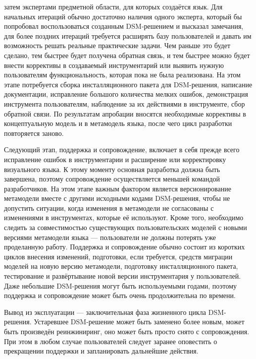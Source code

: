 \begin{enumerate}
		затем экспертами предметной области, для которых создаётся язык. Для начальных 
		итераций обычно достаточно наличия одного эксперта, который бы попробовал воспользоваться 
		созданным DSM-решением и высказал замечания, для более поздних итераций требуется 
		расширять базу пользователей и давать им возможность решать реальные практические задачи. 
		Чем раньше это будет сделано, тем быстрее будет получена обратная связь, и тем 
		быстрее можно будет внести коррективы в создаваемый инструментарий или выявить 
		нужную пользователям функциональность, которая пока не была реализована. На этом 
		этапе потребуется сборка инсталляционного пакета для DSM-решения, написание документации, 
		исправление большого количества мелких ошибок, демонстрация инструмента пользователям, 
		наблюдение за их действиями в инструменте, сбор обратной связи. По результатам 
		апробации вносятся необходимые коррективы в концептуальную модель и в метамодель 
		языка, после чего цикл разработки повторяется заново.
\end{enumerate}

Следующий этап, поддержка и сопровождение, включает в себя прежде всего исправление 
ошибок в инструментарии и расширение или корректировку визуального языка. К этому 
моменту основная разработка должна быть завершена, поэтому сопровождение осуществляется 
меньшей командой разработчиков. На этом этапе важным фактором является версионирование 
метамодели вместе с другими исходными кодами DSM-решения, чтобы не допустить ситуации, 
когда изменения в метамодели не согласованы с изменениями в инструментах, которые её 
используют. Кроме того, необходимо следить за совместимостью существующих пользовательских 
моделей с новыми версиями метамодели языка --- пользователи не должны потерять уже 
проделанную работу. Поддержка и сопровождение обычно состоит из коротких циклов внесения 
изменений, подготовки, если требуется, средств миграции моделей на новую версию метамодели, 
подготовку инсталляционного пакета, тестирование и развёртывание новой версии инструментария 
у пользователей. Даже небольшие DSM-решения могут быть используемыми годами, поэтому 
поддержка и сопровождение может быть очень продолжительна по времени.

Вывод из эксплуатации --- заключительная фаза жизненного цикла DSM-решения. Устаревшее 
DSM-решение может быть заменено более новым, может быть произведён реинжиниринг, оно 
может быть просто снято с сопровождения. При этом в любом случае пользователей следует 
заранее оповестить о прекращении поддержки и запланировать дальнейшие действия.

